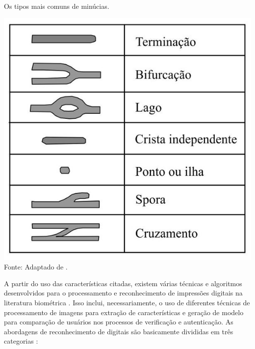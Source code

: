   
  \begin{table}[]
  \centering
  \caption{Os tipos mais comuns de minúcias.}
  \includegraphics[scale=0.54]{figuras/cap2/tipos_minucias.jpg}\\
  Fonte: Adaptado de \cite{maltoni2009handbook}.
  \label{tipos_minucias}
  \end{table}
  
  
  A partir do uso das características citadas, existem várias técnicas e algoritmos desenvolvidos para o processamento e reconhecimento de impressões digitais na literatura biométrica \cite{bhanu2012computational, sarfraz2005computer, ratha2007automatic, alonso2007comparative, tico2001fingerprint, calabaide2006biometria}. Isso inclui, necessariamente, o uso de diferentes técnicas de processamento de imagens para extração de características e geração de modelo para comparação de usuários nos processos de verificação e autenticação. As abordagens de reconhecimento de digitais são basicamente divididas em três categorias \cite{maltoni2009handbook}: 
  
